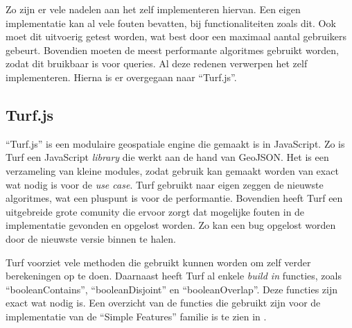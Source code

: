 Zo zijn er vele nadelen aan het zelf implementeren hiervan. Een eigen implementatie kan al vele fouten bevatten, bij functionaliteiten zoals dit. Ook moet dit uitvoerig getest worden, wat best door een maximaal aantal gebruikers gebeurt. Bovendien moeten de meest performante algoritmes gebruikt worden, zodat dit bruikbaar is voor queries. Al deze redenen verwerpen het zelf implementeren. Hierna is er overgegaan naar ``Turf.js''.

\subsection{Turf.js}
``Turf.js'' is een modulaire geospatiale engine die gemaakt is in JavaScript. Zo is Turf een JavaScript \textit{library} die werkt aan de hand van GeoJSON. Het is een verzameling van kleine modules, zodat gebruik kan gemaakt worden van exact wat nodig is voor de \textit{use case}. Turf gebruikt naar eigen zeggen de nieuwste algoritmes, wat een pluspunt is voor de performantie. Bovendien heeft Turf een uitgebreide grote comunity die ervoor zorgt dat mogelijke fouten in de implementatie gevonden en opgelost worden. Zo kan een bug opgelost worden door de nieuwste versie binnen te halen.

Turf voorziet vele methoden die gebruikt kunnen worden om zelf verder berekeningen op te doen. Daarnaast heeft Turf al enkele \textit{build in} functies, zoals ``booleanContains'', ``booleanDisjoint'' en ``booleanOverlap''. Deze functies zijn exact wat nodig is. Een overzicht van de functies die gebruikt zijn voor de implementatie van de ``Simple Features'' familie is te zien in .

